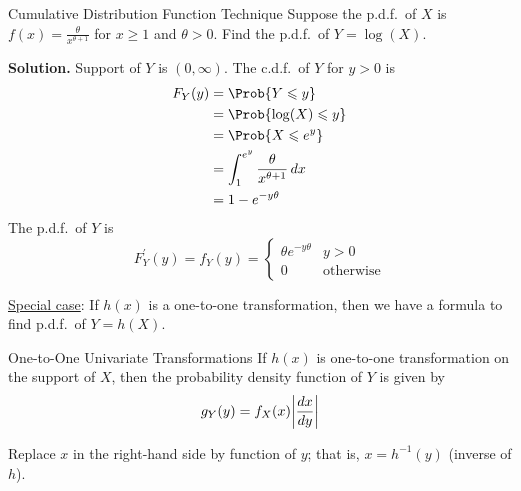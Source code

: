 \begin{Example}{Cumulative Distribution Function Technique}{}
    Suppose the p.d.f.\ of $ X $ is $ \displaystyle  f(x)=
        \frac{\theta}{x^{\theta+1}} $ for $ x\geqslant 1 $
    and $ \theta>0. $
    Find the p.d.f.\ of $ Y=\log(X) $.

    \textbf{Solution.} Support of $ Y $ is $ (0,\infty) $.
    The c.d.f.\ of $ Y $ for $ y>0 $ is
    \begin{align*}
        F_Y(y)
         & =\Prob{Y\leqslant y}                                \\
         & =\Prob{\log(X)\leqslant y}                          \\
         & =\Prob{X\leqslant e^y}                              \\
         & =\int_{1}^{e^y} \frac{\theta}{x^{\theta+1}} \, d{x} \\
         & =1-e^{-y\theta}
    \end{align*}
    The p.d.f.\ of $ Y $ is
    \[ F_Y^\prime(y)
        =f_Y(y)
        =\begin{cases}
            \theta e^{-y\theta} & y>0              \\
            0                   & \text{otherwise}
        \end{cases} \]
\end{Example}
\underline{Special case}: If $ h(x) $
is a one-to-one transformation, then we have a
formula to find p.d.f.\ of $ Y=h(X) $.
\begin{Theorem}{One-to-One Univariate Transformations}{}
    If $ h(x) $ is one-to-one transformation
    on the support of $ X $, then the probability
    density function of $ Y $ is given by
    \[ g_Y(y)=f_X(x)\abs*{\frac{dx}{dy}} \]
\end{Theorem}
\begin{Remark}{}{}
    Replace $ x $ in the right-hand side by
    function of $ y $; that is, $ x=h^{-1}(y) $
    (inverse of $ h $).
\end{Remark}
